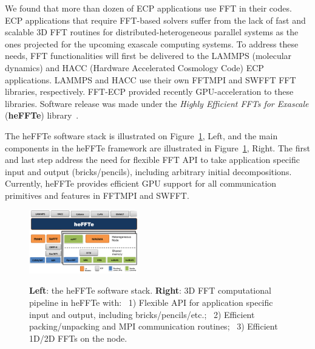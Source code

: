 We found that more than dozen of ECP applications use FFT in their codes.
ECP applications that require FFT-based solvers suffer from the lack of 
fast and scalable 3D FFT routines for distributed-heterogeneous parallel 
systems as the ones projected for the upcoming exascale computing systems. 
To address these needs, FFT functionalities will first be delivered 
to the LAMMPS (molecular dynamics) and HACC (Hardware Accelerated
Cosmology Code) ECP applications. 
LAMMPS and HACC use their own FFTMPI and SWFFT FFT libraries, respectively.
FFT-ECP provided recently GPU-acceleration to these libraries.
Software release was made under the {\it Highly Efficient FFTs for Exascale}
({\bf heFFTe}) library~\cite{thasd19}.

The heFFTe software stack is illustrated on Figure~\ref{fig:fft-ecp-pipeline}, Left,
and the main components in the heFFTe framework are illustrated in 
Figure~\ref{fig:fft-ecp-pipeline}, Right. The first and last step address the need 
for flexible FFT API to take application specific input and output (bricks/pencils), 
including arbitrary initial decompositions. Currently, heFFTe provides efficient
GPU support for all communication primitives and features in FFTMPI and SWFFT.
 
\begin{figure}[htb]
    \centering
    \includegraphics[width=0.42\textwidth]{projects/2.3.3-MathLibs/2.3.3.13-CLOVER/heffte}~~
    \caption{\label{fig:fft-ecp-pipeline}
    {\bf Left}: the heFFTe software stack. {\bf Right}: 3D FFT computational pipeline in heFFTe with:~
      1) Flexible API for application specific input and output,
         including bricks/pencils/etc.;~
      2) Efficient packing/unpacking and MPI communication
         routines;~
      3) Efficient 1D/2D FFTs on the node.}
\end{figure}

